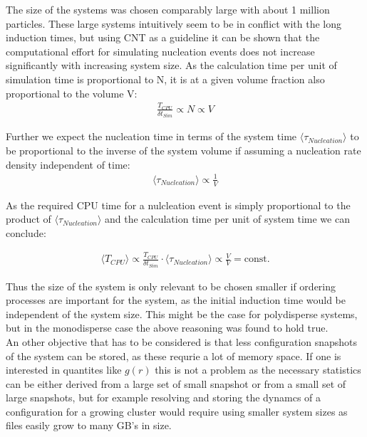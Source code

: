 The size of the systems was chosen comparably large with about 1 million particles. These large systems intuitively seem to be in conflict with the long induction times, but using CNT as a guideline it can be shown that the computational effort for simulating nucleation events does not increase significantly with increasing system size. As the calculation time per unit of simulation time is proportional to N, it is at a given volume fraction also proportional to the volume V:
\begin{align}
\label{eqn:system_size}
\frac{T_{CPU}}{\delta t_{Sim}} \propto N \propto V 
\end{align}

Further we expect the nucleation time in terms of the system time $\langle \tau_{Nucleation} \rangle$ to be proportional to the inverse of the system volume if assuming a nucleation rate density independent of time:
\begin{align}
\langle \tau_{Nucleation} \rangle \propto \frac{1}{V}
\end{align}

As the required CPU time for a nulcleation event is simply proportional to the product of $\langle \tau_{Nucleation} \rangle$ and the calculation time per unit of system time we can conclude:

\begin{align}
\langle T_{CPU} \rangle \propto  \frac{T_{CPU}}{\delta t_{Sim}}  \cdot \langle \tau_{Nucleation} \rangle \propto \frac{V}{V} = \text{const.}
\end{align}

Thus the size of the system is only relevant to be chosen smaller if ordering processes are important for the system, as the initial induction time would be independent of the system size. This might be the case for polydisperse systems, but in the monodisperse case the above reasoning was found to hold true.\\
An other objective that has to be considered is that less configuration snapshots of the system can be stored, as these requrie a lot of memory space. If one is interested in quantites like $g(r)$ this is not a problem as the necessary statistics can be either derived from a large set of small snapshot or from a small set of large snapshots, but for example resolving and storing the dynamcs of a configuration for a growing cluster would require using smaller system sizes as files easily grow to many GB's in size. 

